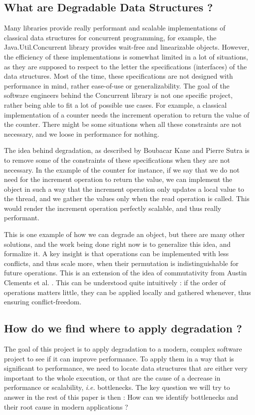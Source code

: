 \documentclass[conference]{IEEEtran}
\begin{document}
\subsection{What are Degradable Data Structures ?}
Many libraries provide really performant and scalable implementations of classical data structures for concurrent programming, for example, the Java.Util.Concurrent library \cite{java_concurrent} provides wait-free and linearizable objects. However, the efficiency of these implementations is somewhat limited in a lot of situations, as they are supposed to respect to the letter the specifications (interfaces) of the data structures. Most of the time, these specifications are not designed with performance in mind, rather ease-of-use or generalizability. The goal of the software engineers behind the Concurrent library is not one specific project, rather being able to fit a lot of possible use cases. For example, a classical implementation of a counter needs the increment operation to return the value of the counter. There might be some situations when all these constraints are not necessary, and we loose in performance for nothing.

The idea behind degradation, as described by Boubacar Kane and Pierre Sutra \cite{degradation} is to remove some of the constraints of these specifications when they are not necessary. In the example of the counter for instance, if we say that we do not need for the increment operation to return the value, we can implement the object in such a way that the increment operation only updates a local value to the thread, and we gather the values only when the read operation is called. This would render the increment operation perfectly scalable, and thus really performant.

This is one example of how we can degrade an object, but there are many other solutions, and the work being done right now is to generalize this idea, and formalize it. A key insight is that operations can be implemented with less conflicts, and thus scale more, when their permutation is indistinguishable for future operations. This is an extension of the idea of commutativity from Austin Clements et al. \cite{scalable}. This can be understood quite intuitively : if the order of operations matters little, they can be applied locally and gathered whenever, thus ensuring conflict-freedom.


\subsection{How do we find where to apply degradation ?}
The goal of this project is to apply degradation to a modern, complex software project to see if it can improve performance. To apply them in a way that is significant to performance, we need to locate data structures that are either very important to the whole execution, or that are the cause of a decrease in performance or scalability, \textit{i.e.} bottlenecks. The key question we will try to answer in the rest of this paper is then : How can we identify bottlenecks and their root cause in modern applications ?
\end{document}
